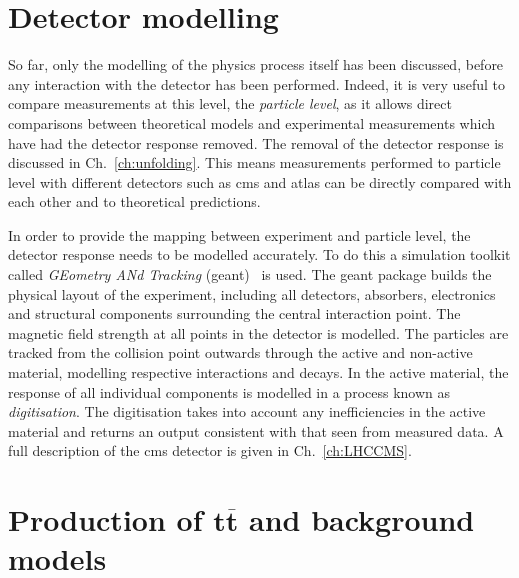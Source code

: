 \section{Detector modelling} %
\label{sec:detector_modelling}

So far, only the modelling of the physics process itself has been discussed, before any interaction with the detector has been performed.
Indeed, it is very useful to compare measurements at this level, the \textit{particle level}, as it allows direct comparisons between theoretical models and experimental measurements which have had the detector response removed.
The removal of the detector response is discussed in Ch.~\ref{ch:unfolding}.
This means measurements performed to particle level with different detectors such as \acrshort{cms} and \acrshort{atlas} can be directly compared with each other and to theoretical predictions.

In order to provide the mapping between experiment and particle level, the detector response needs to be modelled accurately.
To do this a simulation toolkit called \textit{GEometry ANd Tracking} (\acrshort{geant})~\cite{Gen:GEANT} is used.
The \acrshort{geant} package builds the physical layout of the experiment, including all detectors, absorbers, electronics and structural components surrounding the central interaction point.
The magnetic field strength at all points in the detector is modelled.
The particles are tracked from the collision point outwards through the active and non-active material, modelling respective interactions and decays.
In the active material, the response of all individual components is modelled in a process known as \textit{digitisation}.
The digitisation takes into account any inefficiencies in the active material and returns an output consistent with that seen from measured data.
A full description of the \acrshort{cms} detector is given in Ch.~\ref{ch:LHCCMS}.


\section{Production of $\mathbf{t\overline{t}}$ and background models}
\label{sec:ttMC}

